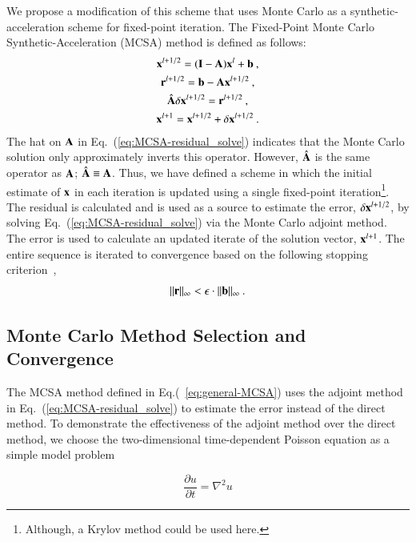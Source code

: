 \documentclass[preprint,12pt]{elsarticle}
\newcommand{\vA}{\ensuremath{\ve{A}}}
\newcommand{\vb}{\ensuremath{\ve{b}}}
\newcommand{\vx}{\ensuremath{\ve{x}}}
\newcommand{\vr}{\ensuremath{\ve{r}}}
\newcommand{\vI}{\ensuremath{\ve{I}}}
\begin{document}
We propose a modification of this scheme that uses Monte Carlo as a
synthetic-acceleration scheme for fixed-point iteration. The
Fixed-Point Monte Carlo Synthetic-Acceleration (MCSA) method is
defined as follows:
\begin{subequations}
  \begin{gather}
    \vx^{l+1/2} = (\vI - \vA)\vx^l + \vb\:, \\
    \vr^{l+1/2} = \vb - \vA\vx^{l+1/2}\:,\\
    \hat{\vA}\delta\vx^{l+1/2} = \vr^{l+1/2}\:,
    \label{eq:MCSA-residual_solve}\\ 
    \vx^{l+1}=\vx^{l+1/2}+\delta\vx^{l+1/2}\:.
  \end{gather}
  \label{eq:general-MCSA}
\end{subequations}
The hat on $\vA$ in Eq.~(\ref{eq:MCSA-residual_solve}) indicates that
the Monte Carlo solution only approximately inverts this operator.
However, $\hat{\vA}$ is the same operator as $\vA$;
$\hat{\vA}\equiv\vA$.  Thus, we have defined a scheme in which the
initial estimate of $\vx$ in each iteration is updated using a single
fixed-point iteration\footnote{Although, a Krylov method could be used
  here.}.  The residual is calculated and is used as a source to
estimate the error, $\delta\vx^{l+1/2}$, by solving
Eq.~(\ref{eq:MCSA-residual_solve}) via the Monte Carlo adjoint method.
The error is used to calculate an updated iterate of the solution
vector, $\vx^{l+1}$.  The entire sequence is iterated to convergence
based on the following stopping criterion~\cite{kelley_1995},
\begin{equation}
  \|\vr\|_{\infty} < \epsilon\cdot\|\vb\|_\infty\:.
  \label{eq:stopping-criteria}
\end{equation}

\subsection{Monte Carlo Method Selection and Convergence}

The MCSA method defined in Eq.(~\ref{eq:general-MCSA}) uses the
adjoint method in Eq.~(\ref{eq:MCSA-residual_solve}) to estimate the
error instead of the direct method. To demonstrate the effectiveness
of the adjoint method over the direct method, we choose the
two-dimensional time-dependent Poisson equation as a simple model
problem

\begin{equation}
  \frac{\partial u}{\partial t} = \nabla^2 u
  \label{eq:poisson_equation}
\end{equation}
\end{document}
